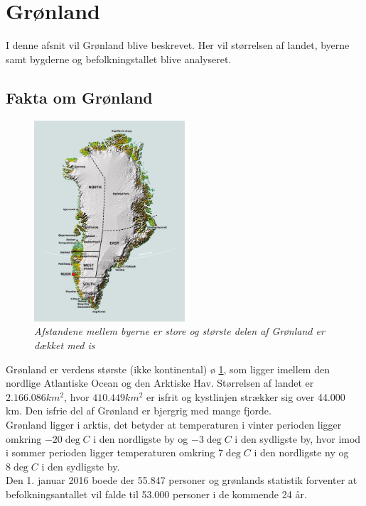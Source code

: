 \newpage
\section{Grønland}
I denne afsnit vil Grønland blive beskrevet. Her vil størrelsen af landet, byerne samt bygderne og befolkningstallet blive analyseret.

\subsection{Fakta om Grønland}
\begin{figure}
	\includegraphics[width=0.5\textwidth]{Figure/greenland.jpg}
	\caption{\textit{Afstandene mellem byerne er store og største delen af Grønland er dækket med is}}
	\label{fig:greenland}
\end{figure} 
Grønland er verdens største (ikke kontinental) ø \ref{fig:greenland}, som ligger imellem den nordlige Atlantiske Ocean og den Arktiske Hav. Størrelsen af landet er $2.166.086 km^{2}$, hvor $410.449 km^{2}$ er isfrit og kystlinjen strækker sig over 44.000 km. Den isfrie del af Grønland er bjergrig med mange fjorde\cite{grlStat}. \\
Grønland ligger i arktis, det betyder at temperaturen i vinter perioden ligger omkring $-20\deg C$ i den nordligste by og $-3\deg C$ i den sydligste by, hvor imod i sommer perioden ligger temperaturen omkring $7\deg C$ i den nordligste ny og $8\deg C$ i den sydligste by\cite{qaanaaq}\cite{nanortalik}.\\
Den 1. januar 2016 boede der 55.847 personer og grønlands statistik forventer at befolkningsantallet vil falde til 53.000 personer i de kommende 24 år\cite{grlStatWeb}.\\\\
